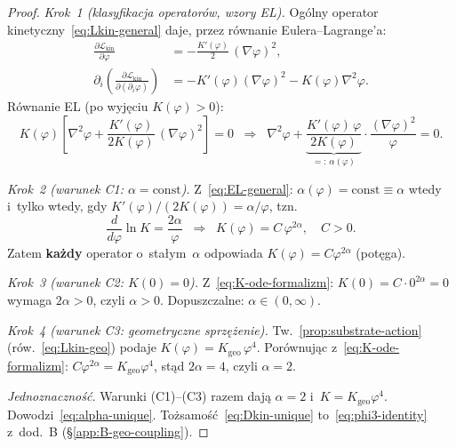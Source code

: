 \begin{proof}
\emph{Krok~1 (klasyfikacja operator\'ow, wzory EL).}
Og\'olny operator kinetyczny~\eqref{eq:Lkin-general} daje,
przez r\'ownanie Eulera--Lagrange'a:
\begin{align}
  \frac{\partial\mathcal{L}_{\mathrm{kin}}}{\partial\varphi}
    &= -\frac{K'(\varphi)}{2}\,(\nabla\varphi)^2, \\
  \partial_i\!\left(\frac{\partial\mathcal{L}_{\mathrm{kin}}}
    {\partial(\partial_i\varphi)}\right)
    &= -K'(\varphi)(\nabla\varphi)^2 - K(\varphi)\nabla^2\varphi.
\end{align}
R\'ownanie EL (po wyj\k{e}ciu $K(\varphi) > 0$):
\begin{equation}\label{eq:EL-general}
  K(\varphi)\!\left[\nabla^2\varphi
    + \frac{K'(\varphi)}{2K(\varphi)}\,(\nabla\varphi)^2\right] = 0
  \;\;\Longrightarrow\;\;
  \nabla^2\varphi
    + \underbrace{\frac{K'(\varphi)\,\varphi}{2K(\varphi)}}_{=:\,\alpha(\varphi)}
    \cdot\frac{(\nabla\varphi)^2}{\varphi} = 0.
\end{equation}

\emph{Krok~2 (warunek C1: $\alpha = \mathrm{const}$).}
Z~\eqref{eq:EL-general}: $\alpha(\varphi) = \mathrm{const} \equiv \alpha$
wtedy i~tylko wtedy, gdy
$K'(\varphi)/(2K(\varphi)) = \alpha/\varphi$,
tzn.\
\begin{equation}\label{eq:K-ode-formalizm}
  \frac{d}{d\varphi}\ln K = \frac{2\alpha}{\varphi}
  \;\;\Longrightarrow\;\;
  K(\varphi) = C\,\varphi^{2\alpha},
  \quad C > 0.
\end{equation}
Zatem \textbf{ka\.zdy} operator o~sta\l{}ym~$\alpha$ odpowiada
$K(\varphi) = C\varphi^{2\alpha}$ (potęga).

\emph{Krok~3 (warunek C2: $K(0) = 0$).}
Z~\eqref{eq:K-ode-formalizm}: $K(0) = C\cdot 0^{2\alpha} = 0$ wymaga $2\alpha > 0$,
czyli $\alpha > 0$.
Dopuszczalne: $\alpha \in (0,\infty)$.

\emph{Krok~4 (warunek C3: geometryczne sprz\k{e}\.zenie).}
Tw.~\ref{prop:substrate-action} (r\'ow.~\eqref{eq:Lkin-geo}) podaje
$K(\varphi) = K_{\mathrm{geo}}\,\varphi^4$.
Por\'ownuj\k{a}c z~\eqref{eq:K-ode-formalizm}:
$C\varphi^{2\alpha} = K_{\mathrm{geo}}\varphi^4$,
st\k{a}d $2\alpha = 4$, czyli $\alpha = 2$.

\emph{Jednoznaczno\'s\'c.}
Warunki (C1)--(C3) razem daj\k{a} $\alpha = 2$ i~$K = K_{\mathrm{geo}}\varphi^4$.
Dowodzi~\eqref{eq:alpha-unique}.
To\.zsamo\'s\'c~\eqref{eq:Dkin-unique} to~\eqref{eq:phi3-identity}
z~dod.~B (\S\ref{app:B-geo-coupling}).
\end{proof}

